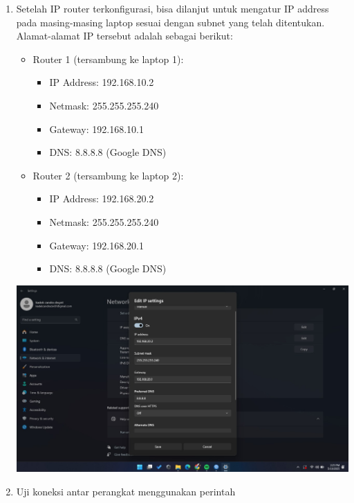 \begin{enumerate}
\begin{enumerate}
\begin{center}
        \end{center}
        \item Setelah IP router terkonfigurasi, bisa dilanjut untuk 
        mengatur IP address pada masing-masing laptop sesuai dengan
        subnet yang telah ditentukan. Alamat-alamat IP tersebut adalah
        sebagai berikut:
        \begin{itemize}
            \item Router 1 (tersambung ke laptop 1):
            \begin{itemize}
                \item IP Address: 192.168.10.2
                \item Netmask: 255.255.255.240
                \item Gateway: 192.168.10.1
                \item DNS: 8.8.8.8 (Google DNS)
            \end{itemize}
            \item Router 2 (tersambung ke laptop 2):
            \begin{itemize}
                \item IP Address: 192.168.20.2
                \item Netmask: 255.255.255.240
                \item Gateway: 192.168.20.1
                \item DNS: 8.8.8.8 (Google DNS)
            \end{itemize}
        \end{itemize}
        \begin{center}
		    \includegraphics[scale=0.4]{P1/img/1-3.jpg}
        \end{center}
        \item Uji koneksi antar perangkat menggunakan perintah 

\end{enumerate}
\end{enumerate}
